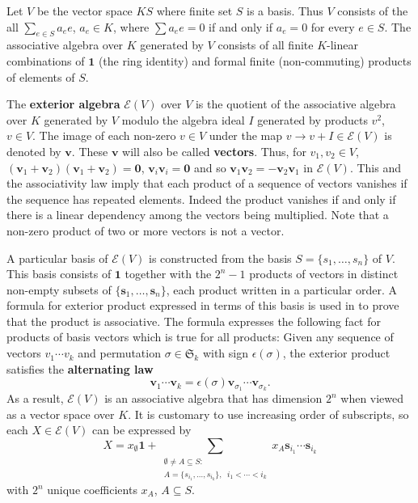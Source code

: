 \documentclass[12pt]{article}
\theoremstyle{definition}
\newcommand{\FieldK}{\ensuremath{K}}
\newcommand{\Perms}{\ensuremath{\mathfrak{S}}}
\newcommand{\ext}[1]{\ensuremath{\mathbf{#1}}}
\begin{document}
Let $V$ be the vector space $\FieldK S$
where finite set $S$ is a basis.  Thus $V$ consists of the
all $\sum_{e\in S}a_e e$, $a_e\in\FieldK$, where
$\sum a_e e = 0$ if and only if $a_e=0$ for every $e\in S$.
The associative algebra over $\FieldK$ generated by $V$ consists
of all finite $\FieldK$-linear combinations of $\mathbf{1}$ (the ring identity) and
formal finite (non-commuting) products of elements of $S$.


The \textbf{exterior algebra} $\mathcal{E}(V)$ over $V$ is the 
quotient of the associative algebra over $\FieldK$ generated by 
$V$ modulo the algebra ideal $I$ generated by products $v^2$, $v\in V$.  
The image of each non-zero $v\in V$ under the map $v\rightarrow v+I\in\mathcal{E}(V)$
is denoted by $\ext{v}$.  These $\ext{v}$ will also be called \textbf{vectors}. 
Thus, for $v_1, v_2\in V$, 
$(\ext{v}_1+\ext{v}_2)(\ext{v}_1+\ext{v}_2)=\ext{0}$,
$\ext{v}_i\ext{v}_i=\ext{0}$ and so $\ext{v}_1\ext{v}_2=-\ext{v}_2\ext{v}_1$ 
in $\mathcal{E}(V)$.  This and
the associativity law imply that each product of a sequence of 
vectors vanishes if the sequence has repeated elements.  Indeed the
product vanishes if and only if there is a linear dependency among
the vectors being multiplied.  Note that a non-zero product of two or more
vectors is not a vector.

A particular basis of $\mathcal{E}(V)$ 
is constructed
from the basis $S=\{s_1, \ldots, s_n\}$ of $V$.  This basis consists
of $\mathbf{1}$ together with the $2^n-1$ products of vectors in 
distinct non-empty subsets of $\{\ext{s}_1, \ldots, \ext{s}_n\}$, each
product written in a particular order.  A formula for exterior
product expressed in terms of this basis is used in \cite{JacobsonI}
to prove that the product is associative.  The formula expresses the
following fact for products of basis vectors which is true for all
products:
Given any sequence of vectors $v_1\cdots v_k$
and permutation $\sigma\in\Perms_k$ with
sign $\epsilon(\sigma)$, the exterior product satisfies the 
\textbf{alternating law}
\[
\ext{v}_1\cdots\ext{v}_k=\epsilon(\sigma)\ext{v}_{\sigma_1}\cdots\ext{v}_{\sigma_k}.
\]
As a result, $\mathcal{E}(V)$ is an associative algebra
that has dimension $2^n$ when viewed as a vector space over $\FieldK$.  
It is customary to use increasing
order of subscripts, so each $X\in\mathcal{E}(V)$ can be expressed by
\[
X = x_{\emptyset}\mathbf{1} + \sum_{\substack{\emptyset\neq A\subseteq S :\\
                           A=\{s_{i_1},\ldots,s_{i_k}\},\;\;  i_1 < \cdots < i_k}}
                         x_A \ext{s}_{i_1}\cdots\ext{s}_{i_k}
\]
with $2^n$ unique coefficients $x_A$, $A\subseteq S$.
\end{document}
